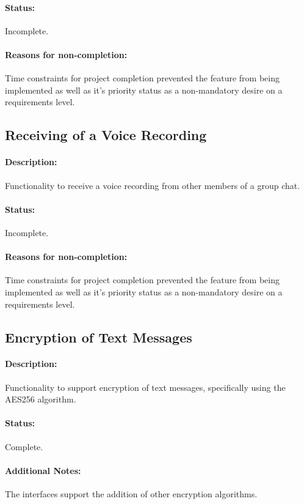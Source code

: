 \documentclass[11pt]{article}
\begin{document}
\paragraph{Status:} Incomplete.
\paragraph{Reasons for non-completion:} Time constraints for project completion prevented the feature from being implemented as well as it's priority status as a non-mandatory desire on a requirements level.

\subsection{Receiving of a Voice Recording}
\paragraph{Description:} Functionality to receive a voice recording from other members of a group chat.
\paragraph{Status:} Incomplete.
\paragraph{Reasons for non-completion:} Time constraints for project completion prevented the feature from being implemented as well as it's priority status as a non-mandatory desire on a requirements level.

\subsection{Encryption of Text Messages}
\paragraph{Description:} Functionality to support encryption of text messages, specifically using the AES256 algorithm.
\paragraph{Status:} Complete.
\paragraph{Additional Notes:} The interfaces support the addition of other encryption algorithms.
\end{document}
